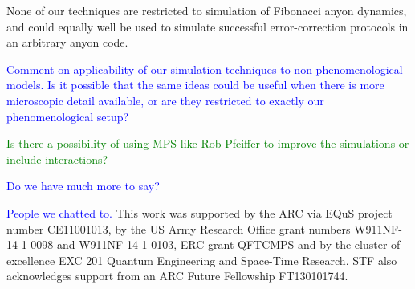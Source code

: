 \documentclass[aps, prl, letterpaper, twocolumn, superscriptaddress, notitlepage, 10pt]{revtex4-1}
\newcommand{\cggb}[1]{\textcolor{blue}{#1}}
\newcommand{\stf}[1]{\textcolor{green}{#1}}
\begin{document}
None of our techniques are restricted to simulation of Fibonacci anyon dynamics, and could 
equally well be used to simulate successful error-correction protocols in an arbitrary anyon 
code.	

\cggb{Comment on applicability of our simulation techniques to non-phenomenological 
models. Is it possible that the same ideas could be useful when there is more microscopic 
detail available, or are they restricted to exactly our phenomenological setup?}

\stf{Is there a possibility of using MPS like Rob Pfeiffer to improve the simulations or 
include interactions?}

\cggb{Do we have much more to say?}


\acknowledgements 

\cggb {People we chatted to.} This work was supported by the ARC via EQuS project number CE11001013, by the US Army Research Office grant numbers W911NF-14-1-0098 and W911NF-14-1-0103, ERC grant QFTCMPS and by the cluster of excellence EXC 201 Quantum Engineering and Space-Time Research. STF also acknowledges support from an ARC Future Fellowship FT130101744.


\end{document}
